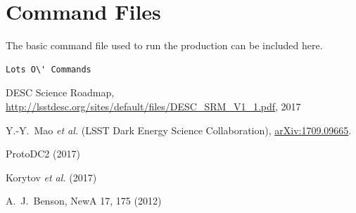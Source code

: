 \documentclass[preprint,times]{aastex61}
\begin{document}
\appendix

\section{Command Files}
\label{sec:command-file}

The basic command file used to run the production can be
included here.

\begin{verbatim}
Lots O\' Commands
\end{verbatim}


\begin{thebibliography}{100}

DESC Science Roadmap,
\url{http://lsstdesc.org/sites/default/files/DESC_SRM_V1_1.pdf}, 2017

 Y.-Y.~Mao {\it et al.\@} (LSST Dark Energy Science Collaboration), \href{https://arxiv.org/abs/1709.09665}{arXiv:1709.09665}.
  
 ProtoDC2 (2017)

 Korytov {\it et al.\@} (2017)

 A.~J.~Benson, NewA 17, 175 (2012)

\end{thebibliography}
\end{document}
